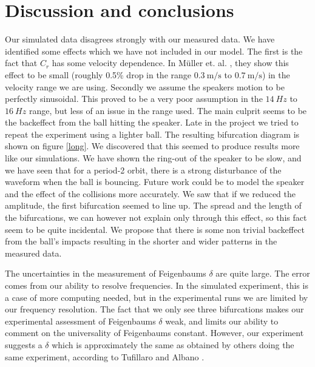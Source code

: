 \documentclass[12pt,oneside,a4paper]{article}
\numberwithin{equation}{section}
\begin{document}
{{{{\section{Discussion and conclusions}
\label{conclusions}
Our simulated data disagrees strongly with our measured data. We have identified some effects which we have not included in our model. The first is the fact that $C_r$ has some velocity dependence. In Müller et. al. \cite{muller}, they show this effect to be small (roughly 0.5\% drop in the range $\SI{0.3}{\meter\per\second}$ to $\SI{0.7}{\meter\per\second}$) in the velocity range we are using. Secondly we assume the speakers motion to be perfectly sinusoidal. This proved to be a very poor assumption in the $\SI{14}{Hz}$ to $\SI{16}{Hz}$ range, but less of an issue in the range used. The main culprit seems to be the backeffect from the ball hitting the speaker. Late in the project we tried to repeat the experiment using a lighter ball. The resulting bifurcation diagram is shown on figure \ref{long}. We discovered that this seemed to produce results more like our simulations. We have shown the ring-out of the speaker to be slow, and we have seen that for a period-2 orbit, there is a strong disturbance of the waveform when the ball is bouncing. Future work could be to model the speaker and the effect of the collisions more accurately. We saw that if we reduced the amplitude, the first bifurcation seemed to line up. The spread and the length of the bifurcations, we can however not explain only through this effect, so this fact seem to be quite incidental. We propose that there is some non trivial backeffect from the ball's impacts resulting in the shorter and wider patterns in the measured data. 
	
The uncertainties in the measurement of Feigenbaums $\delta$ are quite large. The error comes from our ability to resolve frequencies. In the simulated experiment, this is a case of more computing needed, but in the experimental runs we are limited by our frequency resolution. The fact that we only see three bifurcations makes our experimental assessment of Feigenbaums $\delta$ weak, and limits our ability to comment on the universality of Feigenbaums constant. However, our experiment suggests a $\delta$ which is approximately the same as obtained by others doing the same experiment, according to Tufillaro and Albano \cite{tufillaro}.
\newpage




}}}}
\end{document}
